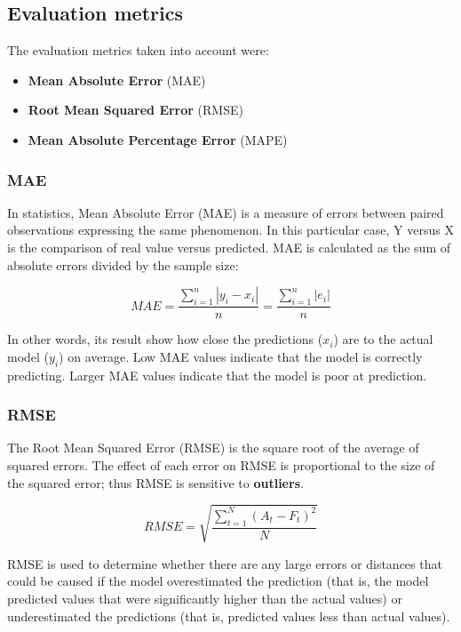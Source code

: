 \subsection{Evaluation metrics}
\label{sec:evaluation-metrics}

The evaluation metrics taken into account were:
\begin{itemize}
  \item \textbf{Mean Absolute Error} (MAE)
  \item \textbf{Root Mean Squared Error} (RMSE)
  \item \textbf{Mean Absolute Percentage Error} (MAPE)
\end{itemize}

\subsubsection{MAE}
In statistics, Mean Absolute Error (MAE) is a measure of errors between paired observations expressing the same phenomenon. \cite{MAE} In this particular case, Y versus X is the comparison of real value versus predicted. MAE is calculated as the sum of absolute errors divided by the sample size:

$$MAE = \frac{\sum ^{n}_{i=1} \left | y_{i} - x_{i} \right |}{n} = \frac{\sum ^{n}_{i=1} \left | e_{i}  \right |}{n}$$

In other words, its result show how close the predictions ($x_i$) are to the actual model ($y_i$) on average.
Low MAE values indicate that the model is correctly predicting. Larger MAE values indicate that the model is poor at prediction. \cite{metrics}

\subsubsection{RMSE}

The Root Mean Squared Error (RMSE) is the square root of the average of squared errors. The effect of each error on RMSE is proportional to the size of the squared error; thus RMSE is sensitive to \textbf{outliers}. \cite{RMSE}

$$RMSE = \sqrt{\frac{\sum_{t=1}^{N}(A_t - F_t)^{2}}{N}}$$

RMSE is used to determine whether there are any large errors or distances that could be caused if the model overestimated the prediction (that is, the model predicted values that were significantly higher than the actual values) or underestimated the predictions (that is, predicted values less than actual values). \cite{metrics}



